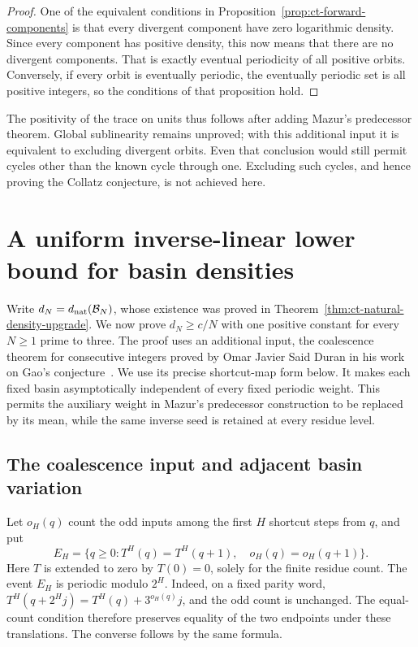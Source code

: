 \documentclass[11pt,a4paper]{article}
\begin{document}
\begin{proof}
One of the equivalent conditions in
Proposition~\ref{prop:ct-forward-components} is that every
divergent component have zero logarithmic density. Since every
component has positive density, this now means that there are no
divergent components. That is exactly eventual periodicity of all
positive orbits. Conversely, if every orbit is eventually periodic,
the eventually periodic set is all positive integers, so the
conditions of that proposition hold.
\end{proof}

The positivity of the trace on units thus follows after adding
Mazur's predecessor theorem. Global sublinearity remains unproved;
with this additional input it is equivalent to excluding divergent
orbits. Even that conclusion would still permit cycles other than
the known cycle through one. Excluding such cycles, and hence
proving the Collatz conjecture, is not achieved here.

\section{A uniform inverse-linear lower bound for basin densities}
\label{sec:ct-periodic-census-floor}

Write \(d_N=d_{\rm nat}(\mathcal B_N)\), whose existence was proved in
Theorem~\ref{thm:ct-natural-density-upgrade}. We now prove
\(d_N\ge c/N\) with one positive constant for every \(N\ge1\)
prime to three. The proof uses an additional input, the coalescence
theorem for consecutive integers proved by Omar Javier Said Duran in
his work on Gao's conjecture~\cite{SaidDuranGao2026,SaidDuranGaoFormal2026}.
We use its precise shortcut-map form below. It makes each fixed basin
asymptotically independent of every fixed periodic weight. This permits
the auxiliary weight in Mazur's predecessor construction to be replaced
by its mean, while the same inverse seed is retained at every residue
level.

\subsection{The coalescence input and adjacent basin variation}

Let \(o_H(q)\) count the odd inputs among the first \(H\) shortcut
steps from \(q\), and put
\[
 E_H=\{q\ge0:T^H(q)=T^H(q+1),\quad o_H(q)=o_H(q+1)\}.
\]
Here \(T\) is extended to zero by \(T(0)=0\), solely for the finite
residue count. The event \(E_H\) is periodic modulo \(2^H\).
Indeed, on a fixed parity word,
\(T^H(q+2^Hj)=T^H(q)+3^{o_H(q)}j\), and the odd count is unchanged.
The equal-count condition therefore preserves equality of the two
endpoints under these translations. The converse follows by the same
formula.
\end{document}
